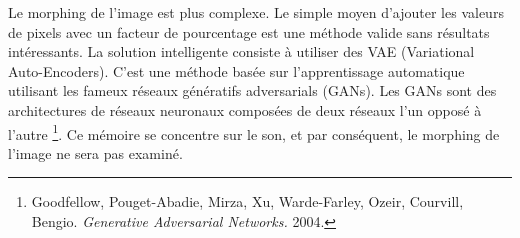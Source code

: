 Le morphing de l'image est plus complexe. Le simple moyen d’ajouter les valeurs de pixels avec un facteur de pourcentage est une méthode valide sans résultats intéressants. La solution intelligente consiste à utiliser des VAE (Variational Auto-Encoders). C'est une méthode basée sur l'apprentissage automatique utilisant les fameux réseaux génératifs adversarials (GANs). Les GANs sont des architectures de réseaux neuronaux composées de deux réseaux l’un opposé à l’autre \footnote{Goodfellow, Pouget-Abadie, Mirza, Xu, Warde-Farley, Ozeir, Courvill, Bengio. \textit{Generative Adversarial Networks.} 2004. \nocite{GANs}}. Ce mémoire se concentre sur le son, et par conséquent, le morphing de l'image ne sera pas examiné.


   
